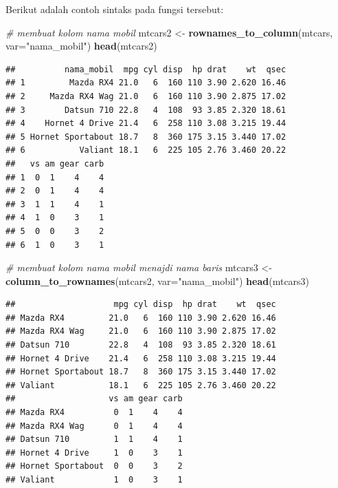 \documentclass[]{book}
\newenvironment{Shaded}{\begin{snugshade}}{\end{snugshade}}
\newcommand{\KeywordTok}[1]{\textcolor[rgb]{0.13,0.29,0.53}{\textbf{#1}}}
\newcommand{\DataTypeTok}[1]{\textcolor[rgb]{0.13,0.29,0.53}{#1}}
\newcommand{\StringTok}[1]{\textcolor[rgb]{0.31,0.60,0.02}{#1}}
\newcommand{\CommentTok}[1]{\textcolor[rgb]{0.56,0.35,0.01}{\textit{#1}}}
\newcommand{\NormalTok}[1]{#1}
\begin{document}
Berikut adalah contoh sintaks pada fungsi tersebut:

\begin{Shaded}
\begin{Highlighting}[]
\CommentTok{# membuat kolom nama mobil}
\NormalTok{mtcars2 <-}\StringTok{ }\KeywordTok{rownames_to_column}\NormalTok{(mtcars, }\DataTypeTok{var=}\StringTok{"nama_mobil"}\NormalTok{)}
\KeywordTok{head}\NormalTok{(mtcars2)}
\end{Highlighting}
\end{Shaded}

\begin{verbatim}
##          nama_mobil  mpg cyl disp  hp drat    wt  qsec
## 1         Mazda RX4 21.0   6  160 110 3.90 2.620 16.46
## 2     Mazda RX4 Wag 21.0   6  160 110 3.90 2.875 17.02
## 3        Datsun 710 22.8   4  108  93 3.85 2.320 18.61
## 4    Hornet 4 Drive 21.4   6  258 110 3.08 3.215 19.44
## 5 Hornet Sportabout 18.7   8  360 175 3.15 3.440 17.02
## 6           Valiant 18.1   6  225 105 2.76 3.460 20.22
##   vs am gear carb
## 1  0  1    4    4
## 2  0  1    4    4
## 3  1  1    4    1
## 4  1  0    3    1
## 5  0  0    3    2
## 6  1  0    3    1
\end{verbatim}

\begin{Shaded}
\begin{Highlighting}[]
\CommentTok{# membuat kolom nama mobil menajdi nama baris}
\NormalTok{mtcars3 <-}\StringTok{ }\KeywordTok{column_to_rownames}\NormalTok{(mtcars2, }\DataTypeTok{var=}\StringTok{"nama_mobil"}\NormalTok{)}
\KeywordTok{head}\NormalTok{(mtcars3)}
\end{Highlighting}
\end{Shaded}

\begin{verbatim}
##                    mpg cyl disp  hp drat    wt  qsec
## Mazda RX4         21.0   6  160 110 3.90 2.620 16.46
## Mazda RX4 Wag     21.0   6  160 110 3.90 2.875 17.02
## Datsun 710        22.8   4  108  93 3.85 2.320 18.61
## Hornet 4 Drive    21.4   6  258 110 3.08 3.215 19.44
## Hornet Sportabout 18.7   8  360 175 3.15 3.440 17.02
## Valiant           18.1   6  225 105 2.76 3.460 20.22
##                   vs am gear carb
## Mazda RX4          0  1    4    4
## Mazda RX4 Wag      0  1    4    4
## Datsun 710         1  1    4    1
## Hornet 4 Drive     1  0    3    1
## Hornet Sportabout  0  0    3    2
## Valiant            1  0    3    1
\end{verbatim}
\end{document}

